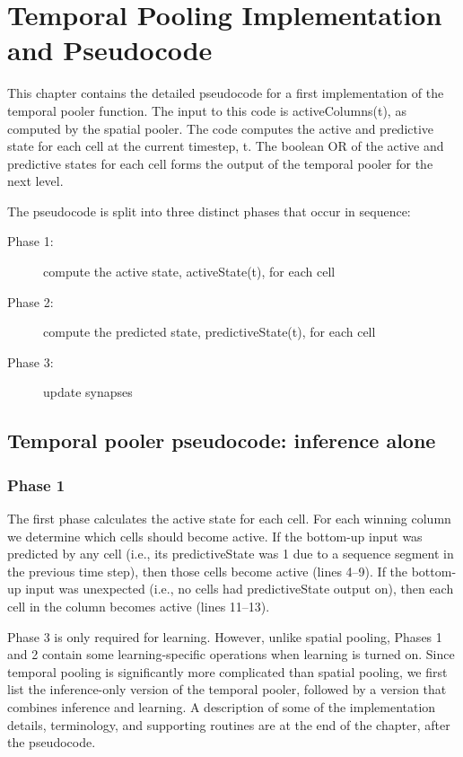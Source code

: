 \documentclass{report}
\begin{document}
\chapter{Temporal Pooling Implementation and Pseudocode}
\label{chapter:temporal-pooling}
This chapter contains the detailed pseudocode for a first
implementation of the temporal pooler function. The input to this code
is activeColumns(t), as computed by the spatial pooler. The code
computes the active and predictive state for each cell at the current
timestep, t. The boolean OR of the active and predictive states for
each cell forms the output of the temporal pooler for the next level.

The pseudocode is split into three distinct phases that occur in sequence:
\begin{description}
\item[Phase 1:] compute the active state, activeState(t), for each cell
\item[Phase 2:] compute the predicted state, predictiveState(t), for each cell
\item[Phase 3:] update synapses
\end{description}

\section*{Temporal pooler pseudocode: inference alone}

\subsection*{Phase 1}
The first phase calculates the active state for each cell. For each
winning column we determine which cells should become active. If the
bottom-up input was predicted by any cell (i.e., its predictiveState
was 1 due to a sequence segment in the previous time step), then those
cells become active (lines 4--9). If the bottom-up input was unexpected
(i.e., no cells had predictiveState output on), then each cell in the
column becomes active (lines 11--13).

Phase 3 is only required for learning. However, unlike spatial
pooling, Phases 1 and 2 contain some learning-specific operations when
learning is turned on. Since temporal pooling is significantly more
complicated than spatial pooling, we first list the inference-only
version of the temporal pooler, followed by a version that combines
inference and learning. A description of some of the implementation
details, terminology, and supporting routines are at the end of the
chapter, after the pseudocode.
\end{document}
